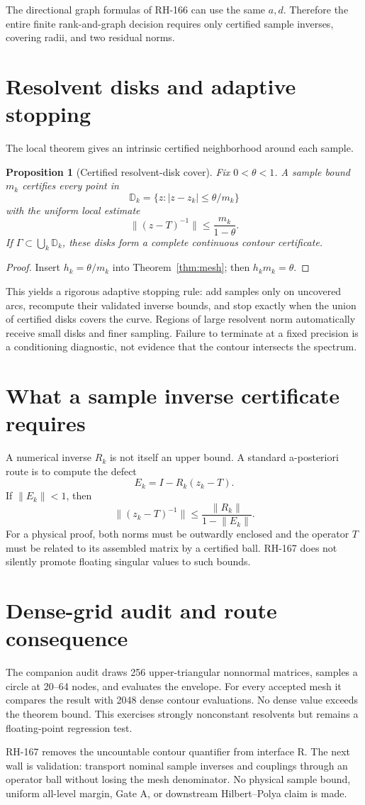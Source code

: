 \documentclass[12pt]{article}
\newtheorem{proposition}[theorem]{Proposition}
\newcommand{\norm}[1]{\lVert#1\rVert}
\begin{document}
The directional graph formulas of RH-166 can use the same $a,d$.  Therefore
the entire finite rank-and-graph decision requires only certified sample
inverses, covering radii, and two residual norms.

\section{Resolvent disks and adaptive stopping}
The local theorem gives an intrinsic certified neighborhood around each
sample.

\begin{proposition}[Certified resolvent-disk cover]
Fix $0<\theta<1$.  A sample bound $m_k$ certifies every point in
\[
 \mathbb D_k=\{z:|z-z_k|\le\theta/m_k\}
\]
with the uniform local estimate
\[
 \norm{(z-T)^{-1}}\le\frac{m_k}{1-\theta}.
\]
If $\Gamma\subset\bigcup_k\mathbb D_k$, these disks form a complete
continuous contour certificate.
\end{proposition}
\begin{proof}
Insert $h_k=\theta/m_k$ into
Theorem~\ref{thm:mesh}; then $h_km_k=\theta$.
\end{proof}

This yields a rigorous adaptive stopping rule: add samples only on uncovered
arcs, recompute their validated inverse bounds, and stop exactly when the
union of certified disks covers the curve.  Regions of large resolvent norm
automatically receive small disks and finer sampling.  Failure to terminate
at a fixed precision is a conditioning diagnostic, not evidence that the
contour intersects the spectrum.

\section{What a sample inverse certificate requires}
A numerical inverse $R_k$ is not itself an upper bound.  A standard
a-posteriori route is to compute the defect
\[
 E_k=I-R_k(z_k-T).
\]
If $\norm{E_k}<1$, then
\[
 \norm{(z_k-T)^{-1}}\le
 \frac{\norm{R_k}}{1-\norm{E_k}}.
\]
For a physical proof, both norms must be outwardly enclosed and the operator
$T$ must be related to its assembled matrix by a certified ball.  RH-167
does not silently promote floating singular values to such bounds.

\section{Dense-grid audit and route consequence}
The companion audit draws 256 upper-triangular nonnormal matrices, samples a
circle at 20--64 nodes, and evaluates the envelope.  For every accepted mesh
it compares the result with 2048 dense contour evaluations.  No dense value
exceeds the theorem bound.  This exercises strongly nonconstant resolvents
but remains a floating-point regression test.

RH-167 removes the uncountable contour quantifier from interface R.  The next
wall is validation: transport nominal sample inverses and couplings through
an operator ball without losing the mesh denominator.  No physical sample
bound, uniform all-level margin, Gate A, or downstream Hilbert--Polya claim
is made.



\end{document}
